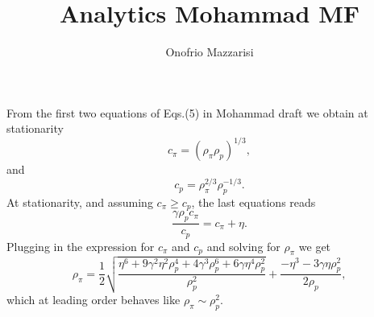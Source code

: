\documentclass[10pt]{article}
\title{Analytics Mohammad MF}
\author{Onofrio Mazzarisi}
\begin{document}

\maketitle

From the first two equations of Eqs.(5) in Mohammad draft we obtain at stationarity
\begin{equation}
c_{\pi}=(\rho_\pi\rho_p)^{1/3},
\end{equation}
and
\begin{equation}
c_p=\rho_{\pi}^{2/3}\rho_p^{-1/3}.
\end{equation}
At stationarity, and assuming $c_{\pi}\geq c_{p}$, the last equations reads
\begin{equation}
\frac{\gamma\rho_pc_{\pi}}{c_p}=c_{\pi}+\eta.
\end{equation}
Plugging in the expression for $c_{\pi}$ and $c_p$ and solving for $\rho_{\pi}$ we get
\begin{equation}
\rho_{\pi}=\frac{1}{2} \sqrt{\frac{\eta ^6+9 \gamma ^2 \eta ^2 \rho_p^4+4 \gamma ^3 \rho_p^6+6 \gamma  \eta ^4 \rho_p^2}{\rho_p^2}}
+\frac{-\eta ^3-3 \gamma  \eta  \rho_p^2}{2 \rho_p},
\end{equation}
which at leading order behaves like $\rho_{\pi}\sim\rho_p^2$.





\end{document}
